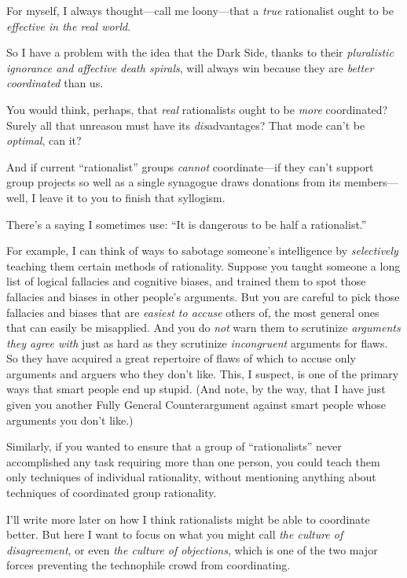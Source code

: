 {
 For myself, I always thought---call me loony---that a
\textit{true} rationalist ought to be \textit{effective in the real
world}.}

{
 So I have a problem with the idea that the Dark Side, thanks to
their \textit{pluralistic ignorance and affective death spirals}, will
always win because they are \textit{better coordinated} than us.}

{
 You would think, perhaps, that \textit{real} rationalists ought to
be \textit{more} coordinated? Surely all that unreason must have its
\textit{dis}advantages? That mode can't be
\textit{optimal}, can it?}

{
 And if current ``rationalist''
groups \textit{cannot} coordinate---if they can't
support group projects so well as a single synagogue draws donations
from its members---well, I leave it to you to finish that syllogism.}

{
 There's a saying I sometimes use:
``It is dangerous to be half a
rationalist.''}

{
 For example, I can think of ways to sabotage
someone's intelligence by \textit{selectively} teaching
them certain methods of rationality. Suppose you taught someone a long
list of logical fallacies and cognitive biases, and trained them to
spot those fallacies and biases in other people's
arguments. But you are careful to pick those fallacies and biases that
are \textit{easiest to accuse} others of, the most general ones that
can easily be misapplied. And you do \textit{not} warn them to
scrutinize \textit{arguments they agree with} just as hard as they
scrutinize \textit{incongruent} arguments for flaws. So they have
acquired a great repertoire of flaws of which to accuse only arguments
and arguers who they don't like. This, I suspect, is
one of the primary ways that smart people end up stupid. (And note, by
the way, that I have just given you another Fully General
Counterargument against smart people whose arguments you
don't like.)}

{
 Similarly, if you wanted to ensure that a group of
``rationalists'' never accomplished
any task requiring more than one person, you could teach them only
techniques of individual rationality, without mentioning anything about
techniques of coordinated group rationality.}

{
 I'll write more later on how I think rationalists
might be able to coordinate better. But here I want to focus on what
you might call \textit{the culture of disagreement}, or even
\textit{the culture of objections}, which is one of the two major
forces preventing the technophile crowd from coordinating.}

